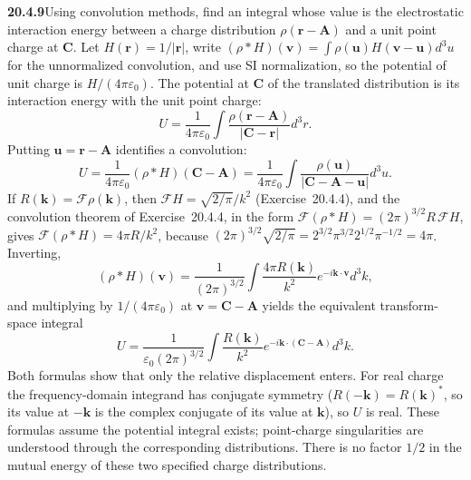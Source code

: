 \par\bigskip
\noindent\textbf{20.4.9}\quad Using convolution methods, find an
integral whose value is the electrostatic interaction energy
between a charge distribution $\rho(\mathbf{r}-\mathbf{A})$ and a
unit point charge at $\mathbf{C}$.
\solution
Let $H(\mathbf r)=1/|\mathbf r|$, write
$(\rho*H)(\mathbf v)=\int\rho(\mathbf u)H(\mathbf v-\mathbf u)d^3u$
for the unnormalized convolution, and use SI normalization, so the potential of unit charge is
$H/(4\pi\varepsilon_0)$. The potential at $\mathbf C$ of
the translated distribution is its interaction energy with the
unit point charge:
\[
U=\frac1{4\pi\varepsilon_0}\int
\frac{\rho(\mathbf r-\mathbf A)}{|\mathbf C-\mathbf r|}d^3r.
\]
Putting $\mathbf u=\mathbf r-\mathbf A$ identifies a convolution:
\[
\boxed{U=\frac1{4\pi\varepsilon_0}(\rho*H)(\mathbf C-\mathbf A)
=\frac1{4\pi\varepsilon_0}\int
\frac{\rho(\mathbf u)}{|\mathbf C-\mathbf A-\mathbf u|}d^3u}.
\]
If $R(\mathbf k)=\mathcal F\rho(\mathbf k)$, then
$\mathcal FH=\sqrt{2/\pi}/k^2$ (Exercise~20.4.4), and the
convolution theorem of Exercise~20.4.4, in the form
$\mathcal F(\rho*H)=(2\pi)^{3/2}R\,\mathcal FH$, gives
$\mathcal F(\rho*H)=4\pi R/k^2$, because
$(2\pi)^{3/2}\sqrt{2/\pi}=2^{3/2}\pi^{3/2}2^{1/2}\pi^{-1/2}=4\pi$.
Inverting,
\[
(\rho*H)(\mathbf v)=\frac1{(2\pi)^{3/2}}
\int\frac{4\pi R(\mathbf k)}{k^2}e^{-i\mathbf k\cdot\mathbf v}d^3k,
\]
and multiplying by $1/(4\pi\varepsilon_0)$ at
$\mathbf v=\mathbf C-\mathbf A$ yields the equivalent
transform-space integral
\[
\boxed{U=\frac1{\varepsilon_0(2\pi)^{3/2}}
\int\frac{R(\mathbf k)}{k^2}
e^{-i\mathbf k\cdot(\mathbf C-\mathbf A)}d^3k}.
\]
Both formulas show that only the relative displacement enters.
For real charge the frequency-domain integrand has conjugate
symmetry ($R(-\mathbf k)=R(\mathbf k)^*$, so its value at
$-\mathbf k$ is the complex conjugate of its value at
$\mathbf k$), so $U$ is real. These formulas assume the potential
integral exists; point-charge singularities are understood through
the corresponding distributions. There is no factor $1/2$ in
the mutual energy of these two specified charge distributions.

